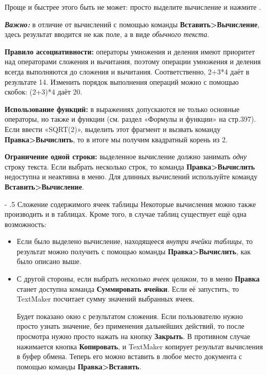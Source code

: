 ﻿\documentclass[a4paper,10pt]{article}
\makeatletter
\renewcommand\paragraph{%
   \@startsection{paragraph}{4}{0mm}%
      {-\baselineskip}%
      {.5\baselineskip}%
      {\normalfont\normalsize\bfseries}}
\makeatother
\begin{document}
Проще и быстрее этого быть не может: просто выделите вычисление и нажмите .

\begin{mdframed}[backgroundcolor=blue!10]
\textbf{\textit{Важно:}} в отличие от вычислений с помощью команды \textbf{Вставить>Вычисление}, здесь результат вводится не как поле, а в виде \textit{обычного текста}.
\end{mdframed}

\textbf{Правило ассоциативности:} операторы умножения и деления имеют приоритет над операторами сложения и вычитания, поэтому операции умножения и деления всегда выполняются до сложения и вычитания. Соответственно, 2+3*4 даёт в результате 14. Изменить порядок выполнения операций можно с помощью скобок: (2+3)*4 даёт 20.

\textbf{Использование функций:} в выражениях допускаются не только основные операторы, но также и функции (см. раздел «Формулы и функции» на стр.397). Если ввести «SQRT(2)», выделить этот фрагмент и вызвать команду \textbf{Правка>Вычислить}, то в итоге мы получим квадратный корень из 2.

\textbf{Ограничение одной строки:} выделенное вычисление должно занимать \textit{одну} строку текста. Если выбрать несколько строк, то команда \textbf{Правка>Вычислить} недоступна и неактивна в меню. Для длинных вычислений используйте команду \textbf{Вставить>Вычисление}.

\paragraph{Сложение содержимого ячеек таблицы}
Некоторые вычисления можно также производить и в таблицах. Кроме того, в случае таблиц существует ещё одна возможность:
\begin{itemize}
 \item Если было выделено вычисление, находящееся \textit{внутри ячейки таблицы}, то результат можно получить с помощью команды \textbf{Правка>Вычислить}, как было описано выше.
 \item С другой стороны, если выбрать \textit{несколько ячеек целиком}, то в меню \textbf{Правка} станет доступна команда \textbf{Суммировать ячейки}. Если её запустить, то TextMaker посчитает сумму значений выбранных ячеек.
 
 Будет показано окно с результатом сложения. Если пользователю нужно просто узнать значение, без применения дальнейших действий, то после просмотра нужно просто нажать на кнопку \textbf{Закрыть}. В противном случае нажимается кнопка \textbf{Копировать}, и TextMaker копирует результат вычисления в буфер обмена. Теперь его можно вставить в любое место документа с помощью команды \textbf{Правка>Вставить}.
\end{itemize}
\end{document}
